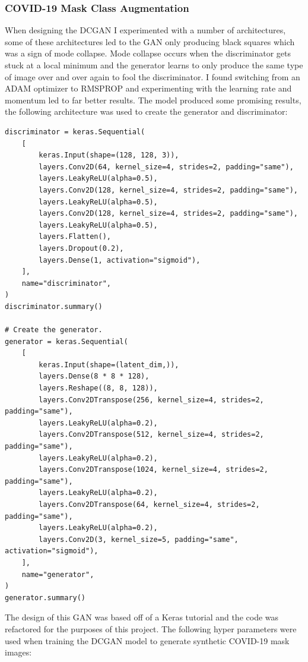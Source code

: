 \subsubsection{COVID-19 Mask Class Augmentation}
When designing the DCGAN I experimented with a number of architectures, some of these architectures led to the GAN only producing black squares which was a sign of mode collapse.  Mode collapse occurs when the discriminator gets stuck at a local minimum and the generator learns to only produce the same type of image over and over again to fool the discriminator. I found switching from an ADAM optimizer to RMSPROP and experimenting with the learning rate and momentum led to far better results.  The model produced some promising results, the following architecture was used to create the generator and discriminator:
\begin{verbatim}
discriminator = keras.Sequential(
    [
        keras.Input(shape=(128, 128, 3)),
        layers.Conv2D(64, kernel_size=4, strides=2, padding="same"),
        layers.LeakyReLU(alpha=0.5),
        layers.Conv2D(128, kernel_size=4, strides=2, padding="same"),
        layers.LeakyReLU(alpha=0.5),
        layers.Conv2D(128, kernel_size=4, strides=2, padding="same"),
        layers.LeakyReLU(alpha=0.5),
        layers.Flatten(),
        layers.Dropout(0.2),
        layers.Dense(1, activation="sigmoid"),
    ],
    name="discriminator",
)
discriminator.summary()

# Create the generator.
generator = keras.Sequential(
    [
        keras.Input(shape=(latent_dim,)),
        layers.Dense(8 * 8 * 128),
        layers.Reshape((8, 8, 128)),
        layers.Conv2DTranspose(256, kernel_size=4, strides=2, padding="same"),
        layers.LeakyReLU(alpha=0.2),
        layers.Conv2DTranspose(512, kernel_size=4, strides=2, padding="same"),
        layers.LeakyReLU(alpha=0.2),
        layers.Conv2DTranspose(1024, kernel_size=4, strides=2, padding="same"),
        layers.LeakyReLU(alpha=0.2),
        layers.Conv2DTranspose(64, kernel_size=4, strides=2, padding="same"),
        layers.LeakyReLU(alpha=0.2),
        layers.Conv2D(3, kernel_size=5, padding="same", activation="sigmoid"),
    ],
    name="generator",
)
generator.summary()
\end{verbatim}
The design of this GAN was based off of a Keras tutorial and the code was refactored for the purposes of this project\cite{DCGANKerasTutorial}.  The following hyper parameters were used when training the DCGAN model to generate synthetic COVID-19 mask images: 
